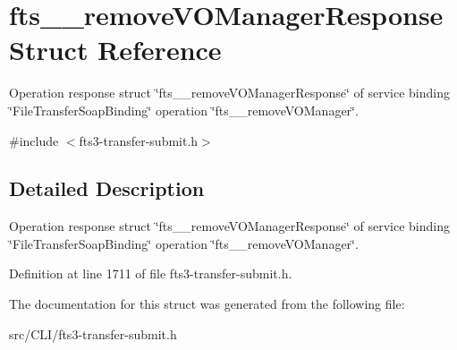 \section{fts\_\-\_\-removeVOManagerResponse Struct Reference}
\label{structfts____removeVOManagerResponse}


Operation response struct \char`\"{}fts\_\-\_\-removeVOManagerResponse\char`\"{} of service binding \char`\"{}FileTransferSoapBinding\char`\"{} operation \char`\"{}fts\_\-\_\-removeVOManager\char`\"{}.  




{\ttfamily \#include $<$fts3-\/transfer-\/submit.h$>$}



\subsection{Detailed Description}
Operation response struct \char`\"{}fts\_\-\_\-removeVOManagerResponse\char`\"{} of service binding \char`\"{}FileTransferSoapBinding\char`\"{} operation \char`\"{}fts\_\-\_\-removeVOManager\char`\"{}. 

Definition at line 1711 of file fts3-\/transfer-\/submit.h.



The documentation for this struct was generated from the following file:\begin{DoxyCompactItemize}
\item 
src/CLI/fts3-\/transfer-\/submit.h\end{DoxyCompactItemize}
